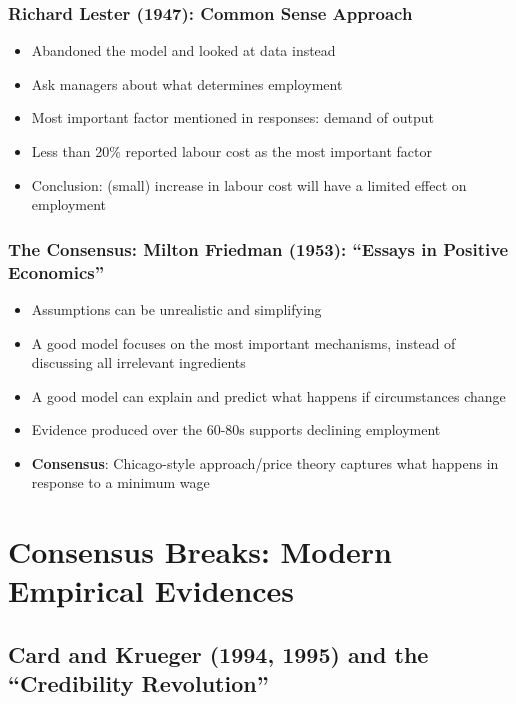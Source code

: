         \subsubsection{Richard Lester (1947): Common Sense Approach}
          \begin{itemize}
              \item Abandoned the model and looked at data instead
              \item Ask managers about what determines employment
              \item Most important factor mentioned in responses: demand of output
              \item Less than 20\% reported labour cost as the most important factor
              \item Conclusion: (small) increase in labour cost will have a limited effect on employment
          \end{itemize}
          
        \subsubsection{The Consensus: Milton Friedman (1953): “Essays in Positive Economics”}
            \begin{itemize}
                \item Assumptions can be unrealistic and simplifying
                \item A good model focuses on the most important mechanisms, instead of discussing all irrelevant ingredients
                \item A good model can explain and predict what happens if circumstances change
                \item Evidence produced over the 60-80s supports declining employment
                \item \textbf{Consensus}: Chicago-style approach/price theory captures what happens in response to a minimum wage
            \end{itemize}
    
\section{Consensus Breaks: Modern Empirical Evidences}

    \subsection{Card and Krueger (1994, 1995) and the “Credibility Revolution”}
    
